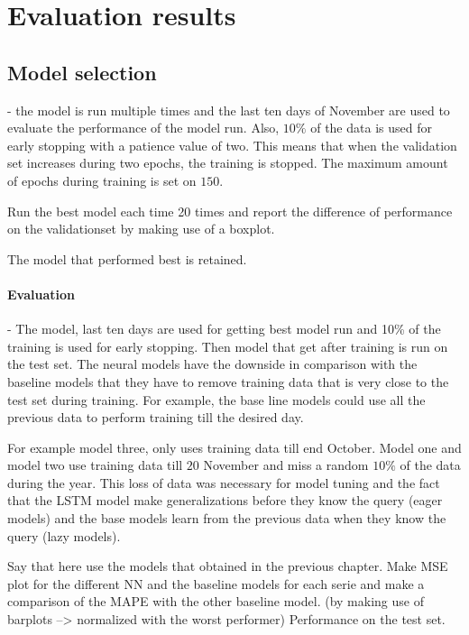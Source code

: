 \chapter{Evaluation results}
\label{cha:Evaluating results}


\section{Model selection}
- the model is run multiple times and the last ten days of November are used to evaluate the performance of the model run. Also, $ 10 \% $ of the data is used for early stopping with a patience value of two. This means that when the validation set increases during two epochs, the training is stopped. The maximum amount of epochs during training is set on $ 150 $.

Run the best model each time 20 times and report the difference of  performance on the validationset by making use of a boxplot. 

The model that performed best is retained.


\subsubsection{Evaluation}

- The model, last ten days are used for getting best model run and 10\% of the training is used for early stopping. Then model that get after training is run on the test set. The neural models have the downside in comparison with the baseline models that they have to remove training data that is very close to the test set during training. For example, the base line models could use all the previous data to perform training till the desired day.

For example model three, only uses training data till end October. Model one and model two use training data till $ 20 $ November and miss a random $ 10 \%$ of the data during the year. This loss of data was necessary for model tuning and the fact that the LSTM model make generalizations before they know the query (eager models) and the base models learn from the previous data when they know the query (lazy models).

Say that here use the models that obtained in the previous chapter. Make MSE plot for the different NN and the baseline models for each serie and make a comparison of the MAPE with the other baseline model. (by making use of barplots --> normalized with the worst performer) Performance on the test set. 

